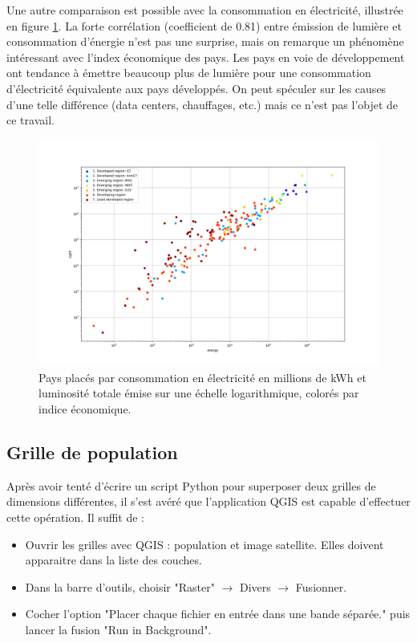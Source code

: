 \documentclass[a4paper, 11pt]{report}
\begin{document}
Une autre comparaison est possible avec la consommation en électricité, illustrée en figure \ref{country_energypop_scatter}. La forte corrélation (coefficient de 0.81) entre émission de lumière et consommation d'énergie n'est pas une surprise, mais on remarque un phénomène intéressant avec l'index économique des pays. Les pays en voie de développement ont tendance à émettre beaucoup plus de lumière pour une consommation d'électricité équivalente aux pays développés. On peut spéculer sur les causes d'une telle différence (data centers, chauffages, etc.) mais ce n'est pas l'objet de ce travail.

\begin{figure}
	\centering
	\includegraphics[width=1.0\textwidth]{img/energy-light.png}
	\caption{Pays placés par consommation en électricité en millions de kWh et luminosité totale émise sur une échelle logarithmique, colorés par indice économique.}
	\label{country_energypop_scatter}
\end{figure}

\subsection{Grille de population}

Après avoir tenté d'écrire un script Python pour superposer deux grilles de dimensions différentes, il s'est avéré que l'application QGIS est capable d'effectuer cette opération. Il suffit de :

\begin{itemize}
	\item Ouvrir les grilles avec QGIS : population et image satellite. Elles doivent apparaitre dans la liste des couches.
	\item Dans la barre d'outils, choisir "Raster" $\rightarrow$ Divers $\rightarrow$ Fusionner.
	\item Cocher l'option "Placer chaque fichier en entrée dans une bande séparée." puis lancer la fusion "Run in Background".
\end{itemize}
\end{document}
